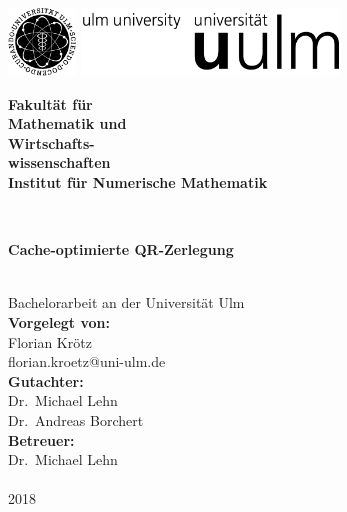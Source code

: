 \documentclass[a4paper,12pt,
headsepline,        %
oneside,            %
bibtotoc,           %
pointlessnumbers,   %
BCOR15mm             %
]{scrbook}
\makeatletter
\newcommand{\fullname}{Florian Krötz}
\newcommand{\email}{florian.kroetz@uni-ulm.de}
\newcommand{\titel}{Cache-optimierte QR-Zerlegung}
\newcommand{\jahr}{2018}
\newcommand{\gutachterA}{Dr.~Michael Lehn}
\newcommand{\gutachterB}{Dr.~Andreas Borchert}
\newcommand{\betreuer}{Dr.~Michael Lehn}
\newcommand{\fakultaet}{Mathematik und\\Wirtschafts-\\wissenschaften}
\newcommand{\institut}{Institut für Numerische Mathematik}
\makeatother
\begin{document}
\frontmatter

\thispagestyle{empty}
\begin{addmargin*}[4mm]{-10mm}

\includegraphics[height=1.8cm]{images/unilogo_bild}
\hfill
\includegraphics[height=1.8cm]{images/unilogo_wort}\\[1em]

{\footnotesize
\hspace*{115mm}\parbox[t]{35mm}{\bfseries Fakultät für\\
\fakultaet\\

\mdseries \institut}\\[2cm]

\parbox{120mm}{\bfseries \LARGE \titel}\\[2.5em]
{\footnotesize Bachelorarbeit an der Universität Ulm}\\[3em]

{\footnotesize \bfseries Vorgelegt von:}\\
{\footnotesize \fullname\\\email}\\[2em]
{\footnotesize \bfseries Gutachter:}\\                     
{\footnotesize\gutachterA\\
\gutachterB}\\[2em]
{\footnotesize \bfseries Betreuer:}\\ 
{\footnotesize\betreuer}\\\\
{\footnotesize\jahr}
}
\end{addmargin*}
\end{document}
